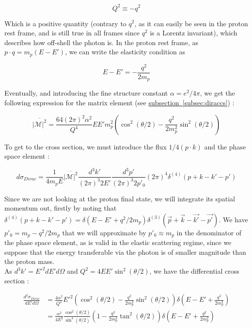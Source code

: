 \documentclass[a4paper,10pt]{report}
\newcommand{\subseclabel}{{subsection}}
\newcommand{\subsecref}[1]{\hyperref[#1]{\subseclabel~\ref*{#1}}}
\begin{document}
\begin{equation}
  Q^2 \equiv -q^2
\end{equation}

Which is a positive quantity (contrary to $q^2$, as it can easily be seen in the proton rest frame, and is still true in all frames since 
$q^2$ is a Lorentz invariant), which describes how off-shell the photon is. In the proton rest frame, as 
$p\cdot q = m_p(E-E')$, we can write the elasticity condition as 

\begin{equation}
  E - E' = -\frac{q^2}{2m_p}
\end{equation}

Eventually, and introducing the fine structure constant $\alpha = e^2/4\pi$, we get the following expression for the matrix element 
(see \subsecref{subsec:diraccs}) :

\begin{equation}
  \overline{|\mathcal{M}|^2} = \frac{64(2\pi)^2 \alpha^2}{Q^4}EE'm_p^2\left(\cos^2(\theta/2) - \frac{q^2}{2m_p^2}\sin^2(\theta/2)\right)
  \label{eq:ps_diracme2}
\end{equation}

To get to the cross section, we must introduce the flux $1/4(p\cdot k)$ and the 
phase space element :

\begin{equation}
  d\sigma_{Dirac} = \frac{1}{4m_p E}\overline{|\mathcal{M}|^2}\frac{d^3k'}{(2\pi)^3 2E'}\frac{d^3p'}{(2\pi)^3 2p'_0}
  (2\pi)^4 \delta^{(4)}(p+k-k'-p')
\end{equation}

Since we are not looking at the proton final state, we will integrate its spatial momentum out, firstly 
by noting that $\delta^{(4)}(p+k-k'-p') = \delta(E - E' + q^2/2m_p)\delta^{(3)}(\vec{p} + \vec{k} - \vec{k'} - \vec{p'})$.
We have $p'_0 = m_p - q^2/2m_p$ that we will approximate by $p'_0 \approx m_p$ in the denominator of the phase space 
element, as is valid in the elastic scattering regime, since we suppose that the energy transferable via the photon is 
of smaller magnitude than the proton mass.\\ 
As $d^3k' = E'^2dE'd\Omega$ and $Q^2 = 4EE'\sin^2(\theta/2)$, we have the differential cross section  : 

\begin{align}
  \frac{d^2\sigma_{Dirac}}{dE'd\Omega} &= \frac{4 \alpha^2}{Q^4} 
   E'^2\left(\cos^2(\theta/2) - \frac{q^2}{2m_p^2}\sin^2(\theta/2)\right)
   \delta(E - E' +\frac{q^2}{2m_p^2}) \nonumber\\
  &= \frac{\alpha^2}{4E^2}\frac{\cos^2(\theta/2)}{\sin^4(\theta/2)}\left(1 - \frac{q^2}{2m^2_p}\tan^2(\theta/2)\right) \delta(E - E' +\frac{q^2}{2m_p^2})
  \label{eq:dirac_cs}
\end{align}
\end{document}
